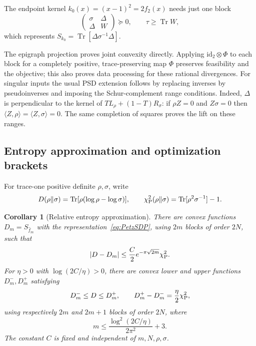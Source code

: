 \documentclass[11pt]{article}
\newtheorem{corollary}[theorem]{Corollary}
\numberwithin{equation}{section}
\newcommand{\tr}{\operatorname{Tr}}
\begin{document}
The endpoint kernel $k_0(x)=(x-1)^2=2f_2(x)$ needs just one block
\begin{equation}\label{eq:chiBlock}
 \begin{pmatrix}\sigma&\Delta\\\Delta&W\end{pmatrix}\succeq0,
 \qquad \tau\ge\tr W,
\end{equation}
which represents $S_{k_0}=\tr[\Delta\sigma^{-1}\Delta]$.

The epigraph projection proves joint convexity directly. Applying
$\mathrm{id}_2\otimes\Phi$ to each block for a completely positive,
trace-preserving map $\Phi$ preserves feasibility and the objective;
this also proves data processing for these rational divergences.
For singular inputs the usual PSD extension follows by replacing
inverses by pseudoinverses and imposing the Schur-complement range
conditions. Indeed, $\Delta$ is perpendicular to the kernel of
$T L_\rho+(1-T)R_\sigma$: if $\rho Z=0$ and $Z\sigma=0$ then
$\langle Z,\rho\rangle=\langle Z,\sigma\rangle=0$.
The same completion of squares proves the lift on these ranges.

\subsection{Entropy approximation and optimization brackets}

For trace-one positive definite $\rho,\sigma$, write
\[
 D(\rho\Vert\sigma)=\tr[\rho(\log\rho-\log\sigma)],\qquad
 \chi_{\rm P}^2(\rho\Vert\sigma)=\tr[\rho^2\sigma^{-1}]-1.
\]

\begin{corollary}[Relative entropy approximation]\label{cor:entropy}
There are convex functions $D_m=S_{\widehat f_m}$ with the
representation~\eqref{eq:PetzSDP}, using $2m$ blocks of order $2N$,
such that
\begin{equation}\label{eq:entropyError}
 |D-D_m|\le\frac C2 e^{-\pi\sqrt{2m}}\chi_{\rm P}^2.
\end{equation}
For $\eta>0$ with $\log(2C/\eta)>0$, there are convex lower and upper
functions $D_m^-,D_m^+$ satisfying
\begin{equation}\label{eq:entropyBracket}
 D_m^-\le D\le D_m^+,\qquad
 D_m^+-D_m^-=\frac\eta2\chi_{\rm P}^2,
\end{equation}
using respectively $2m$ and $2m+1$ blocks of order $2N$, where
\begin{equation}\label{eq:entropyNodeCount}
 m\le\frac{\log^2(2C/\eta)}{2\pi^2}+3.
\end{equation}
The constant $C$ is fixed and independent of $m,N,\rho,\sigma$.
\end{corollary}
\end{document}
